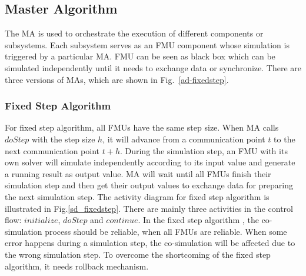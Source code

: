 \subsection{Master Algorithm}
The MA is used to orchestrate the execution of different components or subsystems. Each subsystem serves as an FMU component whose simulation is triggered by a particular MA. FMU can be seen as black box which can be simulated independently until it needs to exchange data or synchronize. There are three versions of MAs, which are shown in Fig.~\ref{ad-fixedstep}.
\begin{figure}[htbp]
\end{figure}
\subsubsection{Fixed Step Algorithm}
For fixed step algorithm, all FMUs have the same step size. When MA calls $doStep$ with the step size $h$, it will advance from a communication point $t$ to the next communication point $t+h$. During the simulation step, an FMU with its own solver will simulate independently according to its input value and generate a running result as output value. MA will wait until all FMUs finish their simulation step and then get their output values to exchange data for preparing the next simulation step. The activity diagram for fixed step algorithm is illustrated in Fig.\ref{sd_fixedstep}. There are mainly three activities in the control flow: $initialize$, $doStep$ and $continue$. In the fixed step algorithm \cite{BromanBGLMTW13}, the co-simulation process should be reliable, when all FMUs are reliable. When some error happens during a simulation step, the co-simulation will be affected due to the wrong simulation step. To overcome the shortcoming of the fixed step algorithm, it needs rollback mechanism.
